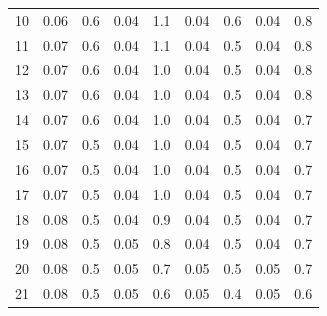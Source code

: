 \documentclass{article}
\begin{document}
{\begin{table}[H]
\begin{tabular}{ccc||cc||cc||cc}
        10 & 0.06                         & 0.6                            & 0.04                           & 1.1                          & 0.04      & 0.6        & 0.04      & 0.8        \\
        11 & 0.07                         & 0.6                            & 0.04                           & 1.1                          & 0.04      & 0.5        & 0.04      & 0.8        \\
        12 & 0.07                         & 0.6                            & 0.04                           & 1.0                          & 0.04      & 0.5        & 0.04      & 0.8        \\
        13 & 0.07                         & 0.6                            & 0.04                           & 1.0                          & 0.04      & 0.5        & 0.04      & 0.8        \\
        14 & 0.07                         & 0.6                            & 0.04                           & 1.0                          & 0.04      & 0.5        & 0.04      & 0.7        \\
        15 & 0.07                         & 0.5                            & 0.04                           & 1.0                          & 0.04      & 0.5        & 0.04      & 0.7        \\
        16 & 0.07                         & 0.5                            & 0.04                           & 1.0                          & 0.04      & 0.5        & 0.04      & 0.7        \\
        17 & 0.07                         & 0.5                            & 0.04                           & 1.0                          & 0.04      & 0.5        & 0.04      & 0.7        \\
        18 & 0.08                         & 0.5                            & 0.04                           & 0.9                          & 0.04      & 0.5        & 0.04      & 0.7        \\
        19 & 0.08                         & 0.5                            & 0.05                           & 0.8                          & 0.04      & 0.5        & 0.04      & 0.7        \\
        20 & 0.08                         & 0.5                            & 0.05                           & 0.7                          & 0.05      & 0.5        & 0.05      & 0.7        \\
        21 & 0.08                         & 0.5                            & 0.05                           & 0.6                          & 0.05      & 0.4        & 0.05      & 0.6        \\

\end{tabular}
\end{table}}
\end{document}
